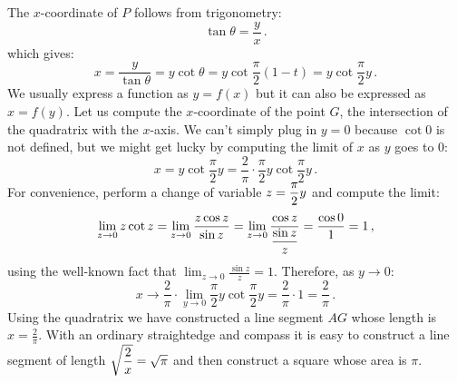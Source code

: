 The $x$-coordinate of $P$ follows from trigonometry:
\[
\tan \theta = \frac{y}{x}\,.
\]
which gives:
\[
x = \frac{y}{\tan\theta}=y\cot\theta=y\cot \frac{\pi}{2}(1-t)=y\cot \frac{\pi}{2}y\,.
\]
We usually express a function as $y=f(x)$ but it can also be expressed as $x=f(y)$. Let us compute the $x$-coordinate of the point $G$, the intersection of the quadratrix with the $x$-axis. We can't simply plug in $y=0$ because $\cot 0$ is not defined, but we might get lucky by computing the limit of $x$ as $y$ goes to $0$:
\[
x = y\cot \frac{\pi}{2}y = \frac{2}{\pi}\cdot \frac{\pi}{2}y\cot \frac{\pi}{2}y\,.
\]
For convenience, perform a change of variable $z=\displaystyle\frac{\pi}{2}y$ and compute the limit:
\[
\lim_{z\rightarrow 0} z\cot z = \lim_{z\rightarrow 0} \frac{z\cos z}{\sin z} = \lim_{z\rightarrow 0} \frac{\cos z}{\displaystyle\frac{\sin z}{z}} = \frac{\cos 0}{1} = 1\,,
\]
using the well-known fact that $\displaystyle\lim_{z\rightarrow 0} \frac{\sin z}{z}=1$.
Therefore, as $y\rightarrow 0$:
\[
x \rightarrow \frac{2}{\pi}\cdot \lim_{y\rightarrow 0}\frac{\pi}{2}y\cot \frac{\pi}{2}y = \frac{2}{\pi}\cdot 1 = \frac{2}{\pi}\,.
\]
Using the quadratrix we have constructed a line segment $AG$ whose length is $x=\displaystyle\frac{2}{\pi}$. With an ordinary straightedge and compass it is easy to construct a line segment of length $\sqrt{\displaystyle\frac{2}{x}}=\sqrt{\pi}$ and then construct a square whose area is $\pi$.


